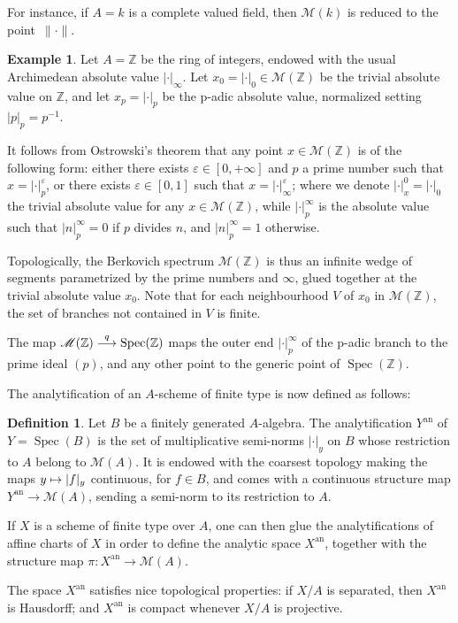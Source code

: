 \documentclass[JEP,XML,SOM,Unicode,published]{cedram}
\newcommand\mto{\mathchoice{\longmapsto}{\mapsto}{\mapsto}{\mapsto}}
\newcommand{\To}[1]{\mathchoice{\xrightarrow{\textstyle\kern4pt#1\kern3pt}}{\stackrel{#1}{\longrightarrow}}{}{}}
\theoremstyle{definition}
\newtheorem{defn}[equation]{Definition}
\newtheorem{ex}[equation]{Example}
\newcommand \Z{\mathbb Z}
\newcommand \M {\mathscr {M}}
\let\eps\varepsilon
\newcommand{\an}{\mathrm{an}}
\DeclareMathOperator{\Sp}{Spec}
\begin{document}
For instance, if $A=k$ is a complete valued field, then $\M(k)$ is reduced to the point~$\lVert \cdot \rVert$.
\begin{ex}
Let $A = \Z$ be the ring of integers, endowed with the usual Archimedean absolute value $\lvert \cdot \rvert_{\infty}$. Let $x_0 = \lvert \cdot \rvert_0 \in \mathscr{M}(\Z)$ be the trivial absolute value on $\Z$, and let $x_p = \lvert \cdot \rvert_p$ be the p-adic absolute value, normalized setting $\lvert p \rvert_p = p^{-1}$.

It follows from Ostrowski's theorem that any point $x \in \M(\Z)$ is of the following form: either there exists $\eps \in [0,+\infty]$ and $p$ a prime number such that $x = \lvert \cdot \rvert_p^{\eps}$, or there exists $\eps \in [0,1]$ such that $x = \lvert \cdot \rvert_{\infty}^{\eps}$; where we denote $\lvert \cdot \rvert_x^0 = \lvert \cdot \rvert_0$ the trivial absolute value for any $x \in \M(\Z)$, while $\lvert \cdot \rvert_p^{\infty}$ is the absolute value such that $\lvert n \rvert_p^{\infty} =0$ if $p$ divides $n$, and $\lvert n \rvert_p^{\infty} =1$ otherwise.

Topologically, the Berkovich spectrum $\M(\Z)$ is thus an infinite wedge of segments parametrized by the prime numbers and $\infty$, glued together at the trivial absolute value $x_0$. Note that for each neighbourhood $V$ of $x_0$ in $\M(\Z)$, the set of branches not contained in $V$ is finite.

The map $\M(\Z) \To{q} \Sp(\Z)$ maps the outer end $\lvert \cdot \rvert_p^{\infty}$ of the p-adic branch to the prime ideal $(p)$, and any other point to the generic point of $\Sp(\Z)$.
\end{ex}
The analytification of an $A$-scheme of finite type is now defined as follows:
\begin{defn} \label{def an} Let $B$ be a finitely generated $A$-algebra. The analytification $Y^{\an}$ of $Y =\Sp(B)$ is the set of multiplicative semi-norms $\lvert \cdot \rvert_y$ on $B$ whose restriction to $A$ belong to $\M(A)$. It is endowed with the coarsest topology making the maps $y \mto \lvert f \rvert_y$ continuous, for $f \in B$, and comes with a continuous structure map $Y^{\an} \to \M(A)$, sending a semi-norm to its restriction to $A$.

If $X$ is a scheme of finite type over $A$, one can then glue the analytifications of affine charts of $X$ in order to define the analytic space $X^{\an}$, together with the structure map $\pi: X^{\an} \to \M(A)$.
\end{defn}
The space $X^{\an}$ satisfies nice topological properties: if $X/A$ is separated, then $X^{\an}$ is Hausdorff; and $X^{\an}$ is compact whenever $X/A$ is projective.
\end{document}
